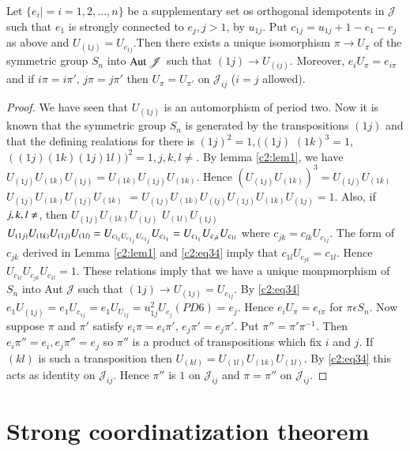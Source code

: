\begin{lemma*}
Let $\{e_i|=i=1,2,\ldots,n\}$ be a supplementary set os orthogonal
idempotents in $\mathscr{J}$ such that $e_1$ is strongly connected to
$e_j, j>1$, by $u_{1j}$. Put $c_{1j}= u_{1j}+1-e_1-e_j$ as above and
$U_{(1j)}=U_{c_{1j}}$.Then there exists a unique isomorphism $\pi\to
U_{\pi}$ of the symmetric group $S_n$ into $\operatorname{Aut} \mathscr{J}$ such that
$(1j)\to U_{(ij)}$. Moreover, $e_iU_{\pi}=e_{i\pi}$ and if
$i\pi=i\pi'$, $j\pi=j\pi'$ then $U_{\pi}=U_{\pi'}$ on
$\mathscr{J}_{ij}$ ($i=j$ allowed).
\end{lemma*}


\begin{proof}
We have seen that $U_{(1j)}$ is an automorphism of period two. Now it
is known that the symmetric group $S_n$ is generated by the
transpositions $(1j)$ and that the defining realations for there is
$(1j)^{2}=1, ((1j)$ $(1k)^{3}=1$,
$((1j)(1k)(1j)1l))^{2}=1,j,k,l\neq$. By lemma \ref{c2:lem1}, we have
$U_{(1j)}U_{(1k)}U_{(1j)}=U_{(1k)}U_{(1j)}U_{(1k)}$. Hence\pageoriginale
$(U_{(1j)}U_{(1k)})^{3}=U_{(1j)} U_{(1k)}$
$U_{(1j)}U_{(1k)}U_{(1j)}U_{(1k)}$ $=U_{(1j)}U_{(1k)}U_{(lj)}U_{(1j)}U_{(1k)}U_{(1j)}=1$. Also,
if $j,k,\break l\neq$, then
$U_{(1j)}U_{(1k)}U_{(1j)}$ $U_{(1l)}U_{(1j)}$ $U_{(1j)}U_{(1k)}U_{(1j)}
U_{(1l)}=U_{c_{1_{l}}U_{c_{1_{j}}}U_{c_{1_{j}}}}\break U_{c_{1_{1}}}= U_{c_{1_{1}}}U_{c_{jk}}U_{c_{1l}}$
where $c_{jk}=c_{lk}U_{c_{1j}}$. The form of $c_{jk}$ derived in Lemma
\ref{c2:lem1} and \eqref{c2:eq34} imply that $c_{1l}U_{c_{jk}}=c_{1l}$. Hence
$U_{c_{1l}}U_{c_{jk}}U_{c_{1l}}=1$. These relations imply that we have
a unique monpmorphism of $S_n$ into Aut $\mathscr{J}$ such that
$(1j)\to U_{(1j)}=U_{c_{1j}}$. By \eqref{c2:eq34} $e_1U_{(1j)}=e_1U_{c_{1j}}=
e_1U_{U_{1j}}=u^{2}_{1j}U_{e_{j}} (PD 6)=e_j$. Hence
$e_{i}U_{\pi} = e_{i\pi}$ for $\pi \epsilon S_n$. Now suppose $\pi$
and $\pi'$ satisfy $e_{i} \pi =e_i \pi'$, $e_j\pi'=e_j \pi'$. Put
$\pi''=\pi'\pi^{-1}$. Then $e_i\pi''=e_i,e_j\pi''=e_j$ so $\pi''$ is a
product of transpositions which fix $i$ and $j$. If $(kl)$ is such a
transposition then $U_{(kl)}=U_{(1l)}U_{(1k)}U_{(1l)}$. By \eqref{c2:eq34} this
acts as identity on $\mathscr{J}_{ij}$. Hence $\pi''$ is $1$ on
$\mathscr{J}_{ij}$ and $\pi=\pi''$ on $\mathscr{J}_{ij}$.
\end{proof}


\section{Strong coordinatization theorem}\label{c2:sec4}

